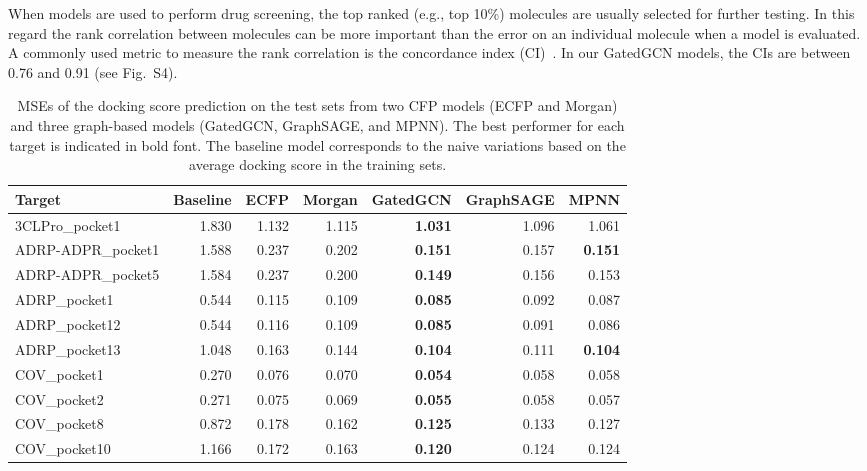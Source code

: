 \documentclass[conference]{IEEEtran}
\begin{document}
When models are used to perform drug screening, the top ranked (e.g., top 10\%) molecules are usually selected for further testing. In this regard the rank correlation between molecules can be more important than the error on an individual molecule when a model is evaluated. A commonly used metric to measure the rank correlation is the concordance index (CI)~\cite{ozturk2018deepdta}. In our GatedGCN models, the CIs are between 0.76 and 0.91 (see Fig.~S4). 

\begin{table}[htb]
\begin{center}
\caption{\label{tab:table-performation} MSEs of the docking score prediction on the test sets from two CFP models (ECFP and Morgan) and three graph-based models (GatedGCN, GraphSAGE, and MPNN). The best performer for each target is indicated in bold font. The baseline model corresponds to the naive variations based on the average docking score in the training sets.}
\begin{tabular}{l|r|rr|rrr}
\toprule
                Target &  Baseline &   ECFP &  Morgan &  GatedGCN &  GraphSAGE &   MPNN \\
\midrule
\hline
        3CLPro\_pocket1 &     1.830 &  1.132 &   1.115 &\bf{1.031} &      1.096 &  1.061 \\
     ADRP-ADPR\_pocket1 &     1.588 &  0.237 &   0.202 &\bf{0.151} &      0.157 &\bf{0.151}\\
     ADRP-ADPR\_pocket5 &     1.584 &  0.237 &   0.200 &\bf{0.149} &      0.156 &  0.153 \\
          ADRP\_pocket1 &     0.544 &  0.115 &   0.109 &\bf{0.085} &      0.092 &  0.087 \\
         ADRP\_pocket12 &     0.544 &  0.116 &   0.109 &\bf{0.085} &      0.091 &  0.086 \\
         ADRP\_pocket13 &     1.048 &  0.163 &   0.144 &\bf{0.104} &      0.111 &\bf{0.104} \\
           COV\_pocket1 &     0.270 &  0.076 &   0.070 &\bf{0.054} &      0.058 &  0.058 \\
           COV\_pocket2 &     0.271 &  0.075 &   0.069 &\bf{0.055} &      0.058 &  0.057 \\
           COV\_pocket8 &     0.872 &  0.178 &   0.162 &\bf{0.125} &      0.133 &  0.127 \\
          COV\_pocket10 &     1.166 &  0.172 &   0.163 &\bf{0.120} &      0.124 &  0.124 \\

\end{tabular}
\end{center}
\end{table}
\end{document}
